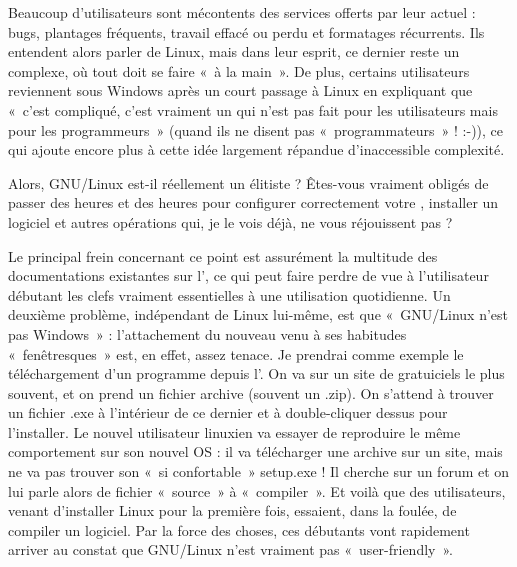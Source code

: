 Beaucoup d'utilisateurs sont mécontents des services offerts par leur  actuel : bugs, plantages fréquents, travail effacé ou perdu et formatages récurrents. Ils entendent alors parler de Linux, mais dans leur esprit, ce dernier reste un  complexe, où tout doit se faire «~à la main~». De plus, certains utilisateurs reviennent sous Windows après un court passage à Linux en expliquant que «~c'est compliqué, c'est vraiment un  qui n'est pas fait pour les utilisateurs mais pour les programmeurs~» (quand ils ne disent pas «~programmateurs~» ! :-)), ce qui ajoute encore plus à cette idée largement répandue d'inaccessible complexité.\par
Alors, GNU/Linux est-il réellement un  élitiste ? Êtes-vous vraiment obligés de passer des heures et des heures pour configurer correctement votre , installer un logiciel et autres opérations qui, je le vois déjà, ne vous réjouissent pas ?\par
Le principal frein concernant ce point est assurément la multitude des documentations existantes sur l', ce qui peut faire perdre de vue à l'utilisateur débutant les clefs vraiment essentielles à une utilisation quotidienne. Un deuxième problème, indépendant de Linux lui-même, est que «~GNU/Linux n'est pas Windows~» : l'attachement du nouveau venu à ses habitudes «~fenêtresques~» est, en effet, assez tenace. Je prendrai comme exemple le téléchargement d'un programme depuis l'. On va sur un site de gratuiciels le plus souvent, et on prend un fichier archive (souvent un .zip). On s'attend à trouver un fichier .exe à l'intérieur de ce dernier et à double-cliquer dessus pour l'installer. Le nouvel utilisateur linuxien va essayer de reproduire le même comportement sur son nouvel OS : il va télécharger une archive sur un site, mais ne va pas trouver son «~si confortable~» setup.exe ! Il cherche sur un forum et on lui parle alors de fichier «~source~» à «~compiler~». Et voilà que des utilisateurs, venant d'installer Linux pour la première fois, essaient, dans la foulée, de compiler un logiciel. Par la force des choses, ces débutants vont rapidement arriver au constat que GNU/Linux n'est vraiment pas «~user-friendly~».\par
